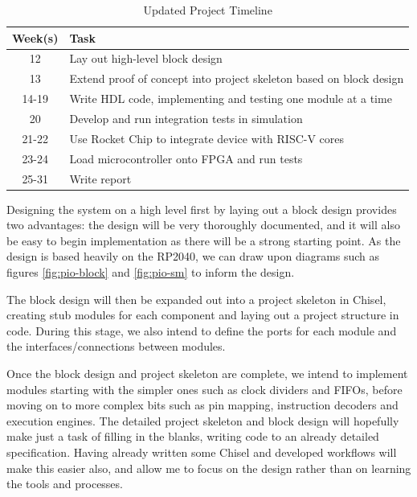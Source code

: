 \documentclass[a4paper,fleqn,12pt]{article}
\begin{document}
\begin{table}[ht!]
	\centering
	\begin{tabular}{|c|l|}
		\hline
		\textbf{Week(s)} & \textbf{Task}                                                       \\ \hline
		12               & Lay out high-level block design                                     \\ \hline
		13               & Extend proof of concept into project skeleton based on block design \\ \hline
		14-19            & Write HDL code, implementing and testing one module at a time       \\ \hline
		20               & Develop and run integration tests in simulation                     \\ \hline
		21-22            & Use Rocket Chip to integrate device with RISC-V cores               \\ \hline
		23-24            & Load microcontroller onto FPGA and run tests                        \\ \hline
		25-31            & Write report                                                        \\ \hline
	\end{tabular}
	\caption{Updated Project Timeline}
	\label{tab:timeline2}
\end{table}


Designing the system on a high level first by laying out a block design provides two advantages: the design will be very thoroughly documented, and it will also be easy to begin implementation as there will be a strong starting point. As the design is based heavily on the RP2040, we can draw upon diagrams such as figures \ref{fig:pio-block} and \ref{fig:pio-sm} to inform the design.

The block design will then be expanded out into a project skeleton in Chisel, creating stub modules for each component and laying out a project structure in code. During this stage, we also intend to define the ports for each module and the interfaces/connections between modules.

Once the block design and project skeleton are complete, we intend to implement modules starting with the simpler ones such as clock dividers and FIFOs, before moving on to more complex bits such as pin mapping, instruction decoders and execution engines. The detailed project skeleton and block design will hopefully make just a task of filling in the blanks, writing code to an already detailed specification. Having already written some Chisel and developed workflows will make this easier also, and allow me to focus on the design rather than on learning the tools and processes.
\end{document}

